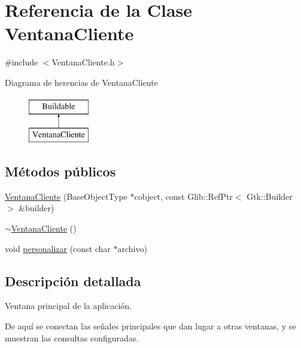 \hypertarget{classVentanaCliente}{\section{\-Referencia de la \-Clase \-Ventana\-Cliente}
\label{classVentanaCliente}
}


{\ttfamily \#include $<$\-Ventana\-Cliente.\-h$>$}

\-Diagrama de herencias de \-Ventana\-Cliente\begin{figure}[H]
\begin{center}
\leavevmode
\includegraphics[height=2.000000cm]{classVentanaCliente}
\end{center}
\end{figure}
\subsection*{\-Métodos públicos}
\begin{DoxyCompactItemize}
\item 
\hyperlink{classVentanaCliente_aaa45f99f0e5e911b73f12e54e61cbd1c}{\-Ventana\-Cliente} (\-Base\-Object\-Type $\ast$cobject, const \-Glib\-::\-Ref\-Ptr$<$ \-Gtk\-::\-Builder $>$ \&builder)
\item 
\hyperlink{classVentanaCliente_a39cd796538f496ce9006f179b19f9f36}{$\sim$\-Ventana\-Cliente} ()
\item 
void \hyperlink{classVentanaCliente_a27571fa02a2ea64bf9abfaa2fa4abfac}{personalizar} (const char $\ast$archivo)
\end{DoxyCompactItemize}


\subsection{\-Descripción detallada}
\-Ventana principal de la aplicación.

\-De aquí se conectan las señales principales que dan lugar a otras ventanas, y se muestran las consultas configuradas. 

